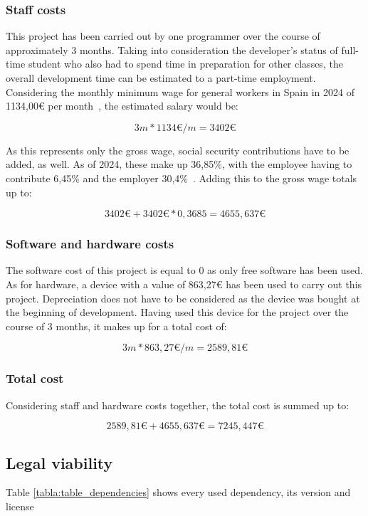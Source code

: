 \subsubsection{Staff costs}
This project has been carried out by one programmer over the course of approximately 3 months. Taking into consideration the developer's status of full-time student who also had to spend time in preparation for other classes, the overall development time can be estimated to a part-time employment. Considering the monthly minimum wage for general workers in Spain in 2024 of 1134,00€ per month~\cite{minimum_wage_spain_2024}, the estimated salary would be:

\[ 3m * 1134\text{€}/m = 3402\text{€} \]

As this represents only the gross wage, social security contributions have to be added, as well. As of 2024, these make up 36,85\%, with the employee having to contribute 6,45\% and the employer 30,4\%~\cite{spain_taxes}. Adding this to the gross wage totals up to:

\[ 3402\text{€} + 3402\text{€} * 0,3685 = 4655,637\text{€} \]

\subsubsection{Software and hardware costs} \label{software_hardware_costs}
The software cost of this project is equal to 0 as only free software has been used. As for hardware, a device with a value of 863,27€ has been used to carry out this project. Depreciation does not have to be considered as the device was bought at the beginning of development. Having used this device for the project over the course of 3 months, it makes up for a total cost of:

\[ 3m * 863,27\text{€}/m = 2589,81\text{€} \]

\subsubsection{Total cost}
Considering staff and hardware costs together, the total cost is summed up to:

\[ 2589,81\text{€} + 4655,637\text{€} = 7245,447\text{€} \]
\pagebreak

\subsection{Legal viability}
Table \ref{tabla:table_dependencies} shows every used dependency, its version and license

